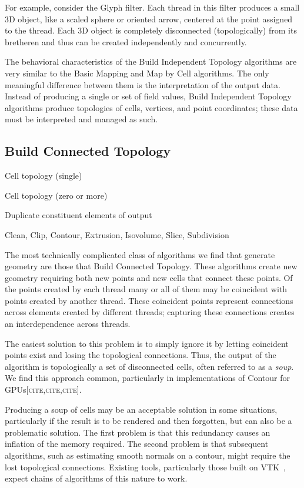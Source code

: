 \documentclass{sig-alternate}
\newcommand*{\lcite}[1]{~\cite{#1}}
\newcommand*{\keyterm}[1]{\emph{#1}}
\newcommand{\fix}[1]{{\color{red}\textsc{[#1]}}}
\newcommand{\algclass}[1]{\textsf{#1}}
\newcommand{\alg}[1]{#1}
\newcommand{\algorithmclasssection}[1]{\subsection*{#1}}
\newcommand{\algorithmclass}[5]{
  \algorithmclasssection{#1} %
  \begin{description}[leftmargin=9em,style=nextline,noitemsep]
    \raggedright
  \item[Input] #2
  \item[Output] #3
  \item[Interdependence] #4
  \item[Algorithms] #5
  \end{description}
}
\begin{document}
For example, consider the \alg{Glyph} filter. Each thread in this filter
produces a small 3D object, like a scaled sphere or oriented arrow,
centered at the point assigned to the thread. Each 3D object is completely
disconnected (topologically) from its bretheren and thus can be created
independently and concurrently.

The behavioral characteristics of the \algclass{Build Independent Topology}
algorithms are very similar to the \algclass{Basic Mapping} and
\algclass{Map by Cell} algorithms. The only meaningful difference between
them is the interpretation of the output data. Instead of producing a
single or set of field values, \algclass{Build Independent Topology}
algorithms produce topologies of cells, vertices, and point coordinates;
these data must be interpreted and managed as such.


\algorithmclass{Build Connected Topology}
               {Cell topology (single)} %
               {Cell topology (zero or more)} %
               {Duplicate constituent elements of output} %
               {Clean, Clip, Contour, Extrusion, Isovolume, Slice, Subdivision}

\noindent
The most technically complicated class of algorithms we find that generate
geometry are those that \algclass{Build Connected Topology}. These
algorithms create new geometry requiring both new points and new cells
that connect these points. Of the points created by each thread many or all
of them may be coincident with points created by another thread. These
coincident points represent connections across elements created by
different threads; capturing these connections creates an interdependence
across threads.

The easiest solution to this problem is to simply ignore it by letting
coincident points exist and losing the topological connections. Thus, the
output of the algorithm is topologically a set of disconnected cells, often
referred to as a \keyterm{soup}. We find this approach common, particularly
in implementations of \alg{Contour} for GPUs\fix{cite,cite,cite}.

Producing a soup of cells may be an acceptable solution in some situations,
particularly if the result is to be rendered and then forgotten, but can
also be a problematic solution. The first problem is that this redundancy
causes an inflation of the memory required. The second problem is that
subsequent algorithms, such as estimating smooth normals on a contour,
might require the lost topological connections. Existing tools,
particularly those built on VTK\lcite{VTK}, expect chains of algorithms of
this nature to work.
\end{document}
